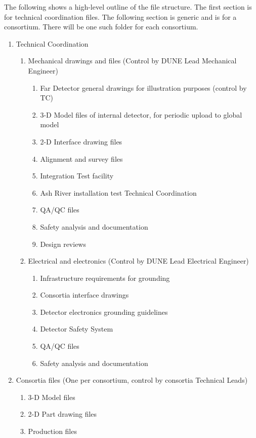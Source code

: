 The following shows a high-level outline of the file structure. The
first section is for technical coordination files. The following
section is generic and is for a consortium. There will be one such
folder for each consortium.
\begin{enumerate}
 \item Technical Coordination
 \begin{enumerate}
  \item Mechanical drawings and files (Control by DUNE Lead Mechanical Engineer)
  \begin{enumerate}
    \item Far Detector general drawings for illustration purposes (control by TC)
    \item 3-D Model files of internal detector, for periodic upload to global model
    \item 2-D Interface drawing files    
    \item Alignment and survey files
    \item Integration Test facility
    \item Ash River installation test Technical Coordination
    \item QA/QC files
    \item Safety analysis and documentation
    \item Design reviews
  \end{enumerate}
  \item Electrical and electronics (Control by DUNE Lead Electrical Engineer)
  \begin{enumerate}
    \item Infrastructure requirements for grounding
    \item Consortia interface drawings
    \item Detector electronics grounding guidelines
    \item Detector Safety System
    \item QA/QC files
    \item Safety analysis and documentation
  \end{enumerate}
 \end{enumerate}
 \item Consortia files (One per consortium, control by consortia Technical Leads)
 \begin{enumerate}
   \item 3-D Model files
   \item 2-D Part drawing files
   \item Production files

\end{enumerate}
\end{enumerate}

